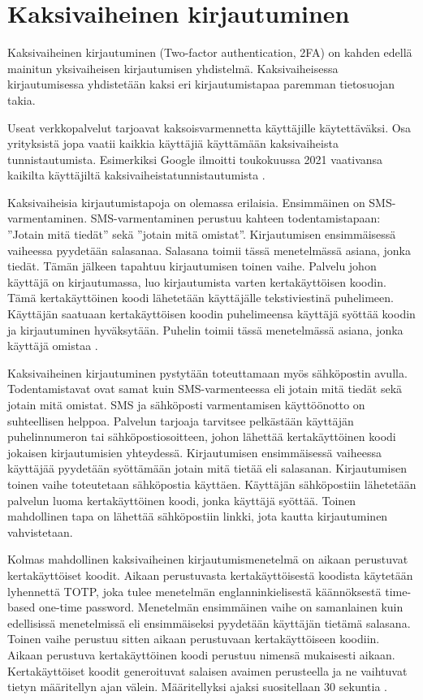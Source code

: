 \section{Kaksivaiheinen kirjautuminen}
Kaksivaiheinen kirjautuminen (Two-factor authentication, 2FA) on kahden edellä mainitun yksivaiheisen kirjautumisen yhdistelmä. Kaksivaiheisessa kirjautumisessa yhdistetään kaksi eri kirjautumistapaa paremman tietosuojan takia. 

Useat verkkopalvelut tarjoavat kaksoisvarmennetta käyttäjille käytettäväksi. Osa yrityksistä jopa vaatii kaikkia käyttäjiä käyttämään kaksivaiheista tunnistautumista. Esimerkiksi Google ilmoitti toukokuussa 2021 vaativansa kaikilta käyttäjiltä kaksivaiheistatunnistautumista \citep{future_without_passwords}.

Kaksivaiheisia kirjautumistapoja on olemassa erilaisia. Ensimmäinen on SMS-varmentaminen. SMS-varmentaminen perustuu kahteen todentamistapaan: ”Jotain mitä tiedät” sekä ”jotain mitä omistat”. Kirjautumisen ensimmäisessä vaiheessa pyydetään salasanaa. Salasana toimii tässä menetelmässä asiana, jonka tiedät. Tämän jälkeen tapahtuu kirjautumisen toinen vaihe. Palvelu johon käyttäjä on kirjautumassa, luo kirjautumista varten kertakäyttöisen koodin. Tämä kertakäyttöinen koodi lähetetään käyttäjälle tekstiviestinä puhelimeen. Käyttäjän saatuaan kertakäyttöisen koodin puhelimeensa käyttäjä syöttää koodin ja kirjautuminen hyväksytään. Puhelin toimii tässä menetelmässä asiana, jonka käyttäjä omistaa \citep{jover2020security}.

Kaksivaiheinen kirjautuminen pystytään toteuttamaan myös sähköpostin avulla. Todentamistavat ovat samat kuin SMS-varmenteessa eli jotain mitä tiedät sekä jotain mitä omistat. SMS ja sähköposti varmentamisen käyttöönotto on suhteellisen helppoa. Palvelun tarjoaja tarvitsee pelkästään käyttäjän puhelinnumeron tai sähköpostiosoitteen, johon lähettää kertakäyttöinen koodi jokaisen kirjautumisien yhteydessä. Kirjautumisen ensimmäisessä vaiheessa käyttäjää pyydetään syöttämään jotain mitä tietää eli salasanan. Kirjautumisen toinen vaihe toteutetaan sähköpostia käyttäen. Käyttäjän sähköpostiin lähetetään palvelun luoma kertakäyttöinen koodi, jonka käyttäjä syöttää. Toinen mahdollinen tapa on lähettää sähköpostiin linkki, jota kautta kirjautuminen vahvistetaan.

Kolmas mahdollinen kaksivaiheinen kirjautumismenetelmä on aikaan perustuvat kertakäyttöiset koodit. Aikaan perustuvasta kertakäyttöisestä koodista käytetään lyhennettä TOTP, joka tulee menetelmän englanninkielisestä käännöksestä time-based one-time password. Menetelmän ensimmäinen vaihe on samanlainen kuin edellisissä menetelmissä eli ensimmäiseksi pyydetään käyttäjän tietämä salasana. Toinen vaihe perustuu sitten aikaan perustuvaan kertakäyttöiseen koodiin. Aikaan perustuva kertakäyttöinen koodi perustuu nimensä mukaisesti aikaan. Kertakäyttöiset koodit generoituvat salaisen avaimen perusteella ja ne vaihtuvat tietyn määritellyn ajan välein. Määritellyksi ajaksi suositellaan 30 sekuntia \citep{m2011totp} \citep{NIST_800_63B}.

